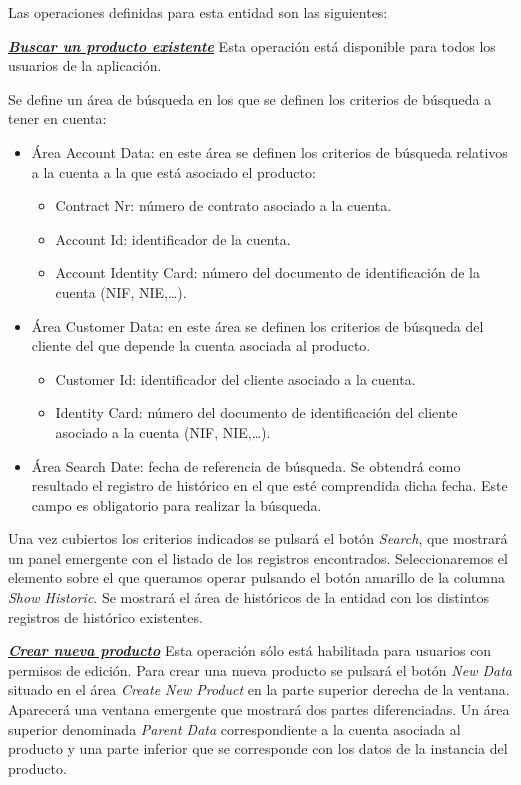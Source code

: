 Las operaciones definidas para esta entidad son las siguientes:


\underline{\textsl{\textbf{Buscar un producto existente}}}\newline
Esta operación está disponible para todos los usuarios de la aplicación.

Se define un área de búsqueda en los que se definen los criterios de búsqueda a tener en cuenta:
\begin{itemize}
	\item Área Account Data: en este área se definen los criterios de búsqueda relativos a la cuenta a la que está asociado el producto:
	\begin{itemize}
		\item Contract Nr: número de contrato asociado a la cuenta.
		\item Account Id: identificador de la cuenta.
		\item Account Identity Card: número del documento de identificación de la cuenta (NIF, NIE,\dots).
	\end{itemize}
	\item Área Customer Data: en este área se definen los criterios de búsqueda del cliente del que depende la cuenta asociada al producto.
	\begin{itemize}
		\item Customer Id: identificador del cliente asociado a la cuenta.
		\item Identity Card: número del documento de identificación del cliente asociado a la cuenta (NIF, NIE,\dots).
	\end{itemize}
	\item Área Search Date: fecha de referencia de búsqueda. Se obtendrá como resultado el registro de histórico en el que esté comprendida dicha fecha. Este campo es obligatorio para realizar la búsqueda.
\end{itemize}

Una vez cubiertos los criterios indicados se pulsará el botón \emph{Search}, que mostrará un panel emergente con el listado de los registros encontrados. Seleccionaremos el elemento sobre el que queramos operar pulsando el botón amarillo de la columna \emph{Show Historic}. Se mostrará el área de históricos de la entidad con los distintos registros de histórico existentes.


\underline{\textsl{\textbf{Crear nueva producto}}}\newline
Esta operación sólo está habilitada para usuarios con permisos de edición.
Para crear una nueva producto se pulsará el botón \textit{New Data} situado en el área \emph{Create New Product} en la parte superior derecha de la ventana. Aparecerá una ventana emergente que mostrará dos partes diferenciadas. Un área superior denominada \emph{Parent Data} correspondiente a la cuenta asociada al producto y una parte inferior que se corresponde con los datos de la instancia del producto.

